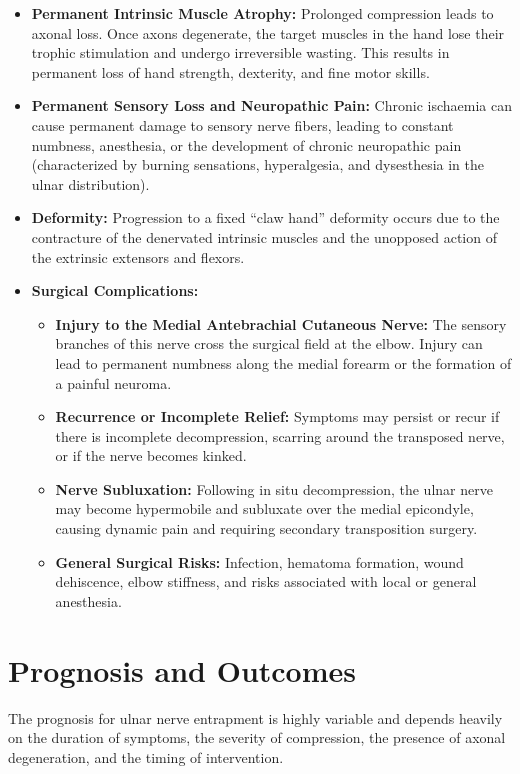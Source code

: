 \begin{itemize}
\item \textbf{Permanent Intrinsic Muscle Atrophy:} Prolonged compression leads to axonal loss. Once axons degenerate, the target muscles in the hand lose their trophic stimulation and undergo irreversible wasting. This results in permanent loss of hand strength, dexterity, and fine motor skills.
\item \textbf{Permanent Sensory Loss and Neuropathic Pain:} Chronic ischaemia can cause permanent damage to sensory nerve fibers, leading to constant numbness, anesthesia, or the development of chronic neuropathic pain (characterized by burning sensations, hyperalgesia, and dysesthesia in the ulnar distribution).
\item \textbf{Deformity:} Progression to a fixed ``claw hand'' deformity occurs due to the contracture of the denervated intrinsic muscles and the unopposed action of the extrinsic extensors and flexors.
\item \textbf{Surgical Complications:}
  \begin{itemize}
  \item \textbf{Injury to the Medial Antebrachial Cutaneous Nerve:} The sensory branches of this nerve cross the surgical field at the elbow. Injury can lead to permanent numbness along the medial forearm or the formation of a painful neuroma.
  \item \textbf{Recurrence or Incomplete Relief:} Symptoms may persist or recur if there is incomplete decompression, scarring around the transposed nerve, or if the nerve becomes kinked.
  \item \textbf{Nerve Subluxation:} Following in situ decompression, the ulnar nerve may become hypermobile and subluxate over the medial epicondyle, causing dynamic pain and requiring secondary transposition surgery.
  \item \textbf{General Surgical Risks:} Infection, hematoma formation, wound dehiscence, elbow stiffness, and risks associated with local or general anesthesia.
  \end{itemize}
\end{itemize}

\section*{Prognosis and Outcomes}
The prognosis for ulnar nerve entrapment is highly variable and depends heavily on the duration of symptoms, the severity of compression, the presence of axonal degeneration, and the timing of intervention.

